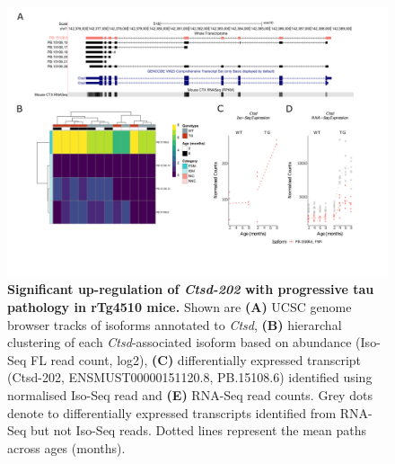 \begin{landscape}
	\begin{figure}[!htp]
		\centering
		\includegraphics[page=1,trim={1.5cm 2.5cm 2cm 2cm}, scale = 0.85]{Figures/Ch5_DiffPlots_Landscape.pdf}
		\captionsetup{width=1.5\textwidth}
		\caption[Differential \textit{Ctsd} transcript expression]%
		{\textbf{Significant up-regulation of \textit{Ctsd-202} with progressive tau pathology in rTg4510 mice.} Shown are \textbf{(A)} UCSC genome browser tracks of isoforms annotated to \textit{Ctsd}, \textbf{(B)} hierarchal clustering of each \textit{Ctsd}-associated isoform based on abundance (Iso-Seq FL read count, log2), \textbf{(C)} differentially expressed transcript (Ctsd-202, ENSMUST00000151120.8, PB.15108.6) identified using normalised Iso-Seq read and \textbf{(E)} RNA-Seq read counts. Grey dots denote to differentially expressed transcripts identified from RNA-Seq but not Iso-Seq reads. Dotted lines represent the mean paths across ages (months).}   
		\label{fig:Ctsd}
	\end{figure}	
\end{landscape}

